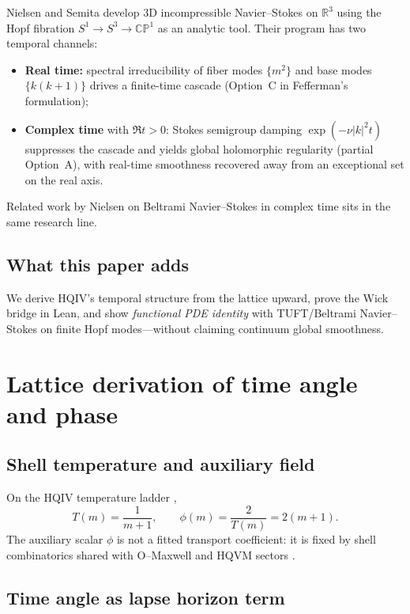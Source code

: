 \documentclass[11pt]{amsart}
\begin{document}
Nielsen and Semita \cite{NielsenSemitaNS2026} develop 3D incompressible Navier--Stokes on
$\mathbb R^3$ using the Hopf fibration $S^1\to S^3\to\mathbb{CP}^1$ as an analytic tool.
Their program has two temporal channels:
\begin{itemize}[leftmargin=2em]
\item \textbf{Real time:} spectral irreducibility of fiber modes $\{m^2\}$ and base modes
  $\{k(k+1)\}$ drives a finite-time cascade (Option~C in Fefferman's formulation);
\item \textbf{Complex time} with $\Re t>0$: Stokes semigroup damping
  $\exp(-\nu|k|^2 t)$ suppresses the cascade and yields global holomorphic regularity (partial
  Option~A), with real-time smoothness recovered away from an exceptional set on the real axis.
\end{itemize}
Related work by Nielsen on Beltrami Navier--Stokes in complex time
\cite{NielsenBeltramiComplexTime2026} sits in the same research line.

\subsection{What this paper adds}

We derive HQIV's temporal structure from the lattice upward, prove the Wick bridge in Lean, and
show \emph{functional PDE identity} with TUFT/Beltrami Navier--Stokes on finite Hopf modes---without
claiming continuum global smoothness.

\section{Lattice derivation of time angle and phase}
\label{sec:lattice}

\subsection{Shell temperature and auxiliary field}

On the HQIV temperature ladder \cite{hqiv-thermo-arrow-paper,hqiv-kirchhoff-paper},
\begin{equation}
  T(m)=\frac{1}{m+1},\qquad \phi(m)=\frac{2}{T(m)}=2(m+1).
  \label{eq:phi-ladder}
\end{equation}
The auxiliary scalar $\phi$ is not a fitted transport coefficient: it is fixed by shell
combinatorics shared with O--Maxwell and HQVM sectors \cite{hqiv-oct-action-paper}.

\subsection{Time angle as lapse horizon term}
\end{document}
